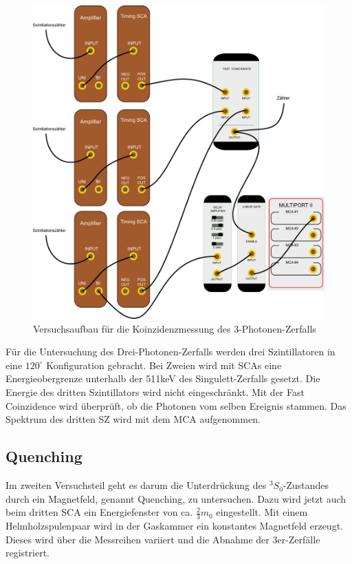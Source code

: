 \begin{figure}
 \includegraphics[width=\textwidth]{BilderAufbau/3er-koinzidenz.pdf}
 \caption{Versuchsaufbau für die Koinzidenzmessung des 3-Photonen-Zerfalls}
 \label{schaltplan_3_sca_coin_mca_zaehler}
\end{figure}

Für die Untersuchung des Drei-Photonen-Zerfalls werden drei Szintillatoren in eine $120^\circ$ Konfiguration gebracht. Bei Zweien wird mit SCAs eine Energieobergrenze unterhalb der 511keV des Singulett-Zerfalls gesetzt. Die Energie des dritten Szintillators wird nicht eingeschränkt. Mit der Fast Coinzidence wird überprüft, ob die Photonen vom selben Ereignis stammen. Das Spektrum des dritten SZ wird mit dem MCA aufgenommen. 

\subsection{Quenching}

Im zweiten Versuchsteil geht es darum die Unterdrückung des ${}^3S_0$-Zustandes durch ein Magnetfeld, genannt Quenching, zu untersuchen. Dazu wird jetzt auch beim dritten SCA ein Energiefenster von ca. $\frac{2}{3} m_0$ eingestellt. Mit einem Helmholzspulenpaar wird in der Gaskammer ein konstantes Magnetfeld erzeugt. Dieses wird über die Messreihen variiert und die Abnahme der 3er-Zerfälle registriert.